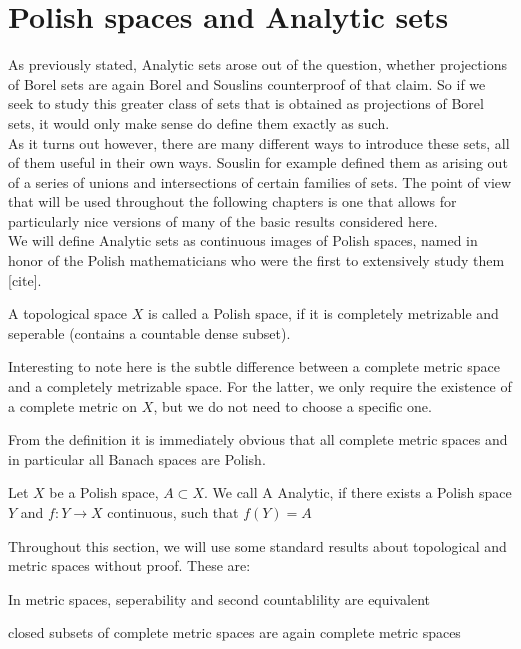 \documentclass[10pt, a4paper, titlepage]{article}
\numberwithin{equation}{section}
\begin{document}
\section{Polish spaces and Analytic sets}
As previously stated, Analytic sets arose out of the question, whether projections of Borel sets are again Borel and Souslins counterproof of that claim. 
So if we seek to study this greater class of sets that is obtained as projections of Borel sets, it would only make sense do define them exactly as such.\\ 
As it turns out however, there are many different ways to introduce these sets, all of them useful in their own ways. 
Souslin for example defined them as arising out of a series of unions and intersections of certain families of sets.
The point of view that will be used throughout the following chapters is one that allows for particularly nice versions of many of the basic results considered here.\\
We will define Analytic sets as continuous images of Polish spaces, named in honor of the Polish mathematicians who were the first to extensively study them [cite].


\begin{definition}
	A topological space $X$ is called a Polish space, if it is completely metrizable and seperable (contains a countable dense subset).
\end{definition}

\begin{remark}
	
Interesting to note here is the subtle difference between a complete metric space and a completely metrizable space.
For the latter, we only require the existence of a complete metric on $X$, but we do not need to choose a specific one.
\end{remark}

From the definition it is immediately obvious that all complete metric spaces and in particular all Banach spaces are Polish.

\begin{definition}
	Let $X$ be a Polish space, $A \subset X$. We call A Analytic, if there exists a Polish space $Y$ and  $f:Y \to X$ continuous, such that  $f(Y) = A$

\end{definition}

Throughout this section, we will use some standard results about topological and metric spaces without proof. These are:
\begin{corollary}
	\label{second_countable}
	In metric spaces, seperability and second countablility are equivalent \cite{kaplansky2001}
\end{corollary}
\begin{corollary}
	\label{closed_cc}
	closed subsets of complete metric spaces are again complete metric spaces \cite{kaplansky2001}
\end{corollary}
\end{document}
